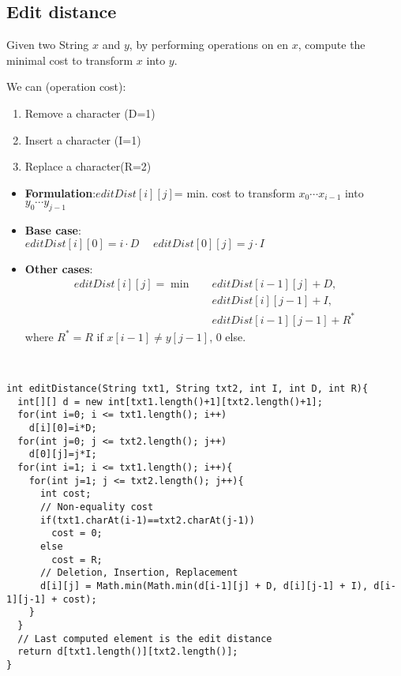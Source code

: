 \subsection{Edit distance}
Given two String $x$ and $y$, by performing operations on en $x$, compute the minimal cost to transform $x$ into $y$.

We can (operation cost):
\begin{enumerate}
 \item Remove a character (D=1)
 \item Insert a character (I=1)
 \item Replace a character(R=2)
\end{enumerate}

\begin{itemize}
 \item \textbf{Formulation}:$
 editDist[i][j] $= min. cost to transform $x_0 \cdots x_{i - 1}$ into $y_0 \cdots y_{j - 1}$
 \item \textbf{Base case}: \\$ editDist[i][0] = i \cdot D \hspace{15pt}
 editDist[0][j] = j \cdot I$
 \item \textbf{Other cases}:
 \begin{align*}
 editDist[i][j] = \min  \quad  & editDist[i - 1][j] + D, \\
                               & editDist[i][j - 1] + I, \\
                               & editDist[i - 1][j - 1] + R^*
 \end{align*}
 where $R^* = R$ if $x[i-1] \neq y[j-1]$, $0$ else.
\end{itemize}
\ \newline
\begin{lstlisting}
int editDistance(String txt1, String txt2, int I, int D, int R){
  int[][] d = new int[txt1.length()+1][txt2.length()+1];
  for(int i=0; i <= txt1.length(); i++)
    d[i][0]=i*D;
  for(int j=0; j <= txt2.length(); j++)
    d[0][j]=j*I;
  for(int i=1; i <= txt1.length(); i++){
    for(int j=1; j <= txt2.length(); j++){
      int cost;
      // Non-equality cost
      if(txt1.charAt(i-1)==txt2.charAt(j-1))
        cost = 0;
      else
        cost = R;
      // Deletion, Insertion, Replacement
      d[i][j] = Math.min(Math.min(d[i-1][j] + D, d[i][j-1] + I), d[i-1][j-1] + cost);
    }
  }
  // Last computed element is the edit distance
  return d[txt1.length()][txt2.length()];
}
\end{lstlisting}